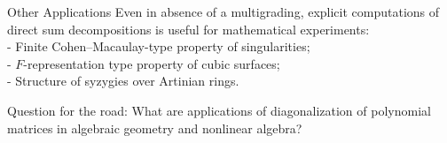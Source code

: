 \documentclass[beamer]{paper}
\begin{document}
\begin{frame}{Other Applications}
  Even in absence of a multigrading, explicit computations of direct
  sum decompositions is useful for mathematical experiments: \\[1em]
  \; - Finite Cohen--Macaulay-type property of singularities; \\
  \; - $F$-representation type property of cubic surfaces; \\
  \; - Structure of syzygies over Artinian rings. \\

  \vfill
  \pause
  \begin{block}{Question for the road:}
    \centering
    What are applications of diagonalization of polynomial \\
    matrices in algebraic geometry and nonlinear algebra?
  \end{block}
\end{frame}






\end{document}
